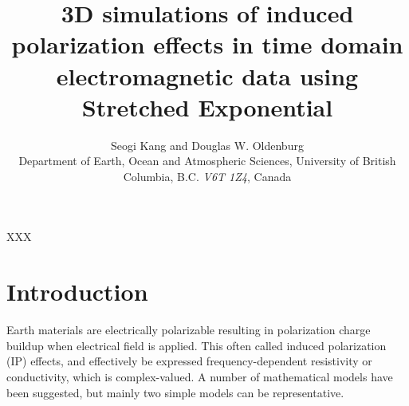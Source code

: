 \documentclass[extra,mreferee]{gji}
\author[Seogi Kang and Douglas W. Oldenburg]
   {Seogi Kang and Douglas W. Oldenburg \\
    Department of Earth, Ocean and Atmospheric Sciences,
    University of British Columbia,
    B.C. \emph{V6T 1Z4}, Canada
  }
\title{3D simulations of induced polarization effects in time domain electromagnetic data using Stretched Exponential}
\begin{document}
\label{firstpage}

\maketitle


\begin{summary}
XXX
\end{summary}

\section{Introduction}
Earth materials are electrically polarizable resulting in polarization charge buildup when electrical field is applied. This often called induced polarization (IP) effects, and effectively be expressed frequency-dependent resistivity or conductivity, which is complex-valued. A number of mathematical models have been suggested, but mainly two simple models can be representative.

\end{document}
